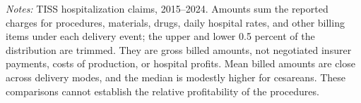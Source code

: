 \begin{table}[H]\centering
\caption{\textbf{Total amount billed per delivery hospitalization}}
\label{tab:cost}
\small
\small\setlength{\tabcolsep}{4pt}
\begin{minipage}{\linewidth}\footnotesize
\textit{Notes:} TISS hospitalization claims, 2015--2024. Amounts sum the reported charges for procedures, materials, drugs, daily hospital rates, and other billing items under each delivery event; the upper and lower 0.5 percent of the distribution are trimmed. They are gross billed amounts, not negotiated insurer payments, costs of production, or hospital profits. Mean billed amounts are close across delivery modes, and the median is modestly higher for cesareans. These comparisons cannot establish the relative profitability of the procedures.
\end{minipage}
\end{table}
